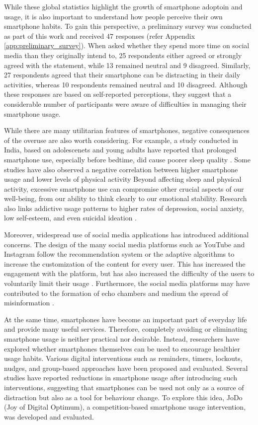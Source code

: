 \documentclass[11pt]{report}
\begin{document}
While these global statistics highlight the growth of smartphone adoptoin and usage, it is also important 
to understand how people perceive their own smartphone habits. To gain this perspective, a preliminary survey
was conducted as part of this work and received 47 responses (refer Appendix \ref{app:preliminary_survey}). When asked whether they spend more time on 
social media than they originally intend to, 25 respondents either agreed or strongly agreed with the 
statement, while 13 remained neutral and 9 disagreed. Similarly, 27 respondents agreed that their 
smartphone can be distracting in their daily activities, whereas 10 respondents remained neutral and 
10 disagreed. Although these responses are based on self-reported perceptions, they suggest that a 
considerable number of participants were aware of difficulties in managing their smartphone usage.

While there are many utilitarian features of smartphones, negative consequences of the overuse are also worth 
considering. For example, a study conducted in India, based on adolescenets and young adults 
have reported that prolonged smartphone use, especially before bedtime, did cause poorer sleep 
quality \cite{maurya2022smartphone_sleep}. Some studies have also observed a negative correlation between 
higher smartphone usage and lower levels of physical activity \cite{bhargava2021attentioneconomy} 
Beyond affecting sleep and physical activity, excessive smartphone use can 
compromise other crucial aspects of our well-being, from our ability to think 
clearly to our emotional stability. Research also links addictive usage patterns to 
higher rates of depression, social anxiety, low self-esteem, and even suicidal ideation \cite{bhargava2021attentioneconomy}.

Moreover, widespread use of social media applications has introduced additional 
concerns. The design of the many social media platforms such as YouTube and Instagram 
follow the recommendation system or the adaptive algorithms to increase the 
customization of the content for every user. This has increased the engagement 
with the platform, but has also increased the difficulty of the users to voluntarily limit their usage \cite{de2025socialmedia,bhargava2021attentioneconomy}.
Furthermore, the social media platforms may have contributed to the formation of 
echo chambers and medium the spread of misinformation \cite{cinelli2021echochamber}.

At the same time, smartphones have become an important part of everyday life and provide 
many useful services. Therefore, completely avoiding or eliminating smartphone usage is 
neither practical nor desirable. Instead, researchers have explored whether smartphones 
themselves can be used to encourage healthier usage habits. Various digital interventions 
such as reminders, timers, lockouts, nudges, and group-based approaches have been proposed 
and evaluated. Several studies have reported reductions in smartphone usage after 
introducing such interventions, suggesting that smartphones can be used not only as a 
source of distraction but also as a tool for behaviour change. To explore this idea, 
JoDo (Joy of Digital Optimum), a competition-based smartphone usage intervention, was 
developed and evaluated.
\end{document}
